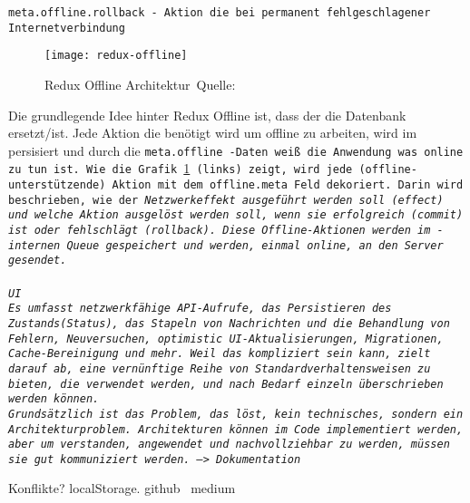 \tt{meta.offline.rollback} - Aktion die bei permanent fehlgeschlagener Internetverbindung
~\cite{redux-offline-gh}
\begin{figure}[H]
  \centering
  \texttt{[image: redux-offline]}
  \grayRule
  \caption[Redux Offline]{Redux Offline Architektur~Quelle:~\cite{redux-offline}}
  \label{fig:redux-offline}
\end{figure}
Die grundlegende Idee hinter Redux Offline ist, dass der  die Datenbank ersetzt/ist. Jede Aktion die benötigt wird um offline zu arbeiten, wird im  persisiert und durch die \tt{meta.offline} -Daten weiß die Anwendung was online zu tun ist. Wie die Grafik \ref{fig:redux-offline} (links) zeigt, wird jede (offline-unterstützende) Aktion mit dem \tt{offline.meta} Feld dekoriert. Darin wird beschrieben, wie der \it{Netzwerkeffekt} ausgeführt werden soll (\tt{effect}) und welche Aktion ausgelöst werden soll, wenn sie erfolgreich (\tt{commit}) ist oder fehlschlägt (\tt{rollback}). Diese Offline-Aktionen werden im -internen \gls{Queue} gespeichert und werden, einmal online, an den Server gesendet.\\\\
\gls{UI}\\
Es umfasst netzwerkfähige \gls{API}-Aufrufe, das Persistieren des Zustands(Status), das Stapeln von Nachrichten und die Behandlung von Fehlern, Neuversuchen, \gls{optimistic UI}-Aktualisierungen, Migrationen, Cache-Bereinigung und mehr.
Weil das kompliziert sein kann, zielt  darauf ab, eine vernünftige Reihe von Standardverhaltensweisen zu bieten, die verwendet werden, und nach Bedarf einzeln überschrieben werden können.\\
Grundsätzlich ist das Problem, das  löst, kein technisches, sondern ein Architekturproblem. Architekturen können im Code implementiert werden, aber um verstanden, angewendet und nachvollziehbar zu werden, müssen sie gut kommuniziert werden. --> Dokumentation

{\large Konflikte?}
%
%
localStorage. github~\cite{redux-persist-gh} medium~\cite{redux-persist}
%
%
